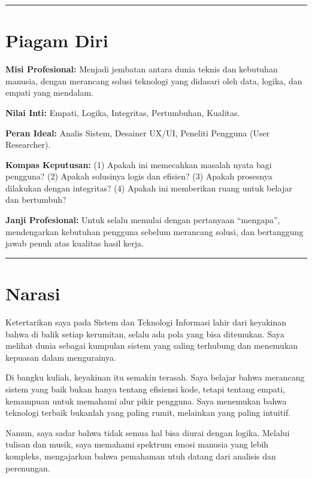 \documentclass[
  letterpaper,
  DIV=11,
  numbers=noendperiod]{scrreprt}
\begin{document}
\begin{center}\rule{0.5\linewidth}{0.5pt}\end{center}

\section{Piagam Diri}\label{piagam-diri}

\textbf{Misi Profesional:} Menjadi jembatan antara dunia teknis dan
kebutuhan manusia, dengan merancang solusi teknologi yang didasari oleh
data, logika, dan empati yang mendalam.

\textbf{Nilai Inti:} Empati, Logika, Integritas, Pertumbuhan, Kualitas.

\textbf{Peran Ideal:} Analis Sistem, Desainer UX/UI, Peneliti Pengguna
(User Researcher).

\textbf{Kompas Keputusan:} (1) Apakah ini memecahkan masalah nyata bagi
pengguna? (2) Apakah solusinya logis dan efisien? (3) Apakah prosesnya
dilakukan dengan integritas? (4) Apakah ini memberikan ruang untuk
belajar dan bertumbuh?

\textbf{Janji Profesional:} Untuk selalu memulai dengan pertanyaan
``mengapa'', mendengarkan kebutuhan pengguna sebelum merancang solusi,
dan bertanggung jawab penuh atas kualitas hasil kerja.

\begin{center}\rule{0.5\linewidth}{0.5pt}\end{center}

\section{Narasi}\label{narasi}

Ketertarikan saya pada Sistem dan Teknologi Informasi lahir dari
keyakinan bahwa di balik setiap kerumitan, selalu ada pola yang bisa
ditemukan. Saya melihat dunia sebagai kumpulan sistem yang saling
terhubung dan menemukan kepuasan dalam mengurainya.

Di bangku kuliah, keyakinan itu semakin terasah. Saya belajar bahwa
merancang sistem yang baik bukan hanya tentang efisiensi kode, tetapi
tentang empati, kemampuan untuk memahami alur pikir pengguna. Saya
menemukan bahwa teknologi terbaik bukanlah yang paling rumit, melainkan
yang paling intuitif.

Namun, saya sadar bahwa tidak semua hal bisa diurai dengan logika.
Melalui tulisan dan musik, saya memahami spektrum emosi manusia yang
lebih kompleks, mengajarkan bahwa pemahaman utuh datang dari analisis
dan perenungan.
\end{document}
